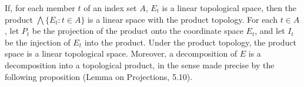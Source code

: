 If, for each member $t$ of an index set $A$, $E_t$ is a linear topological space, then the product $\bigwedge \{E_t : t \in A\}$ is a linear space with the product topology. For each $t \in A$, let $P_t$ be the projection of the product onto the coordinate space $E_t$, and let $I_t$ be the injection of $E_t$ into the product. Under the product topology, the product space is a linear topological space. Moreover, a decomposition of $E$ is a decomposition into a topological product, in the sense made precise by the following proposition (Lemma on Projections, 5.10).
